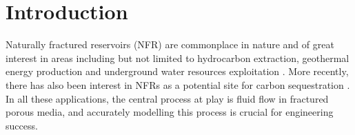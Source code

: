 \documentclass[draft]{agujournal2018}
\begin{document}
%
%

%


%
%
%
%


\section{Introduction}
Naturally fractured reservoirs (NFR) are commonplace in nature and of great interest in areas including but not limited to hydrocarbon extraction, geothermal energy production and underground water resources exploitation \citep{Berkowitz2002}. More recently, there has also been 
interest in NFRs as a potential site for carbon sequestration \citep{March2018}. In all these applications, the central process at play is fluid flow in fractured porous media, and accurately modelling this process is crucial for engineering success.
\end{document}
